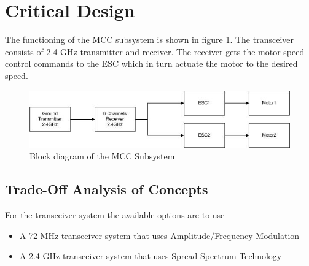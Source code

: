 \section{Critical Design}

The functioning of the \ac{MCC} subsystem is shown in figure \ref{fig:design_block}. The transceiver consists of 2.4 GHz transmitter and receiver. The receiver gets the motor speed control commands to the ESC which in turn actuate the motor to the desired speed.

\pagebreak

\begin{figure}[bht]
\centering
\includegraphics[scale=0.8]{figures/blockdiagram.jpg}
\caption{Block diagram of the MCC Subsystem}
\label{fig:design_block}
\end{figure}





\subsection{Trade-Off Analysis of Concepts}

For the transceiver system the available options are to use
\begin{itemize}
\item A 72 MHz transceiver system that uses Amplitude/Frequency Modulation
\item A 2.4 GHz transceiver system that uses Spread Spectrum Technology
\end{itemize}

